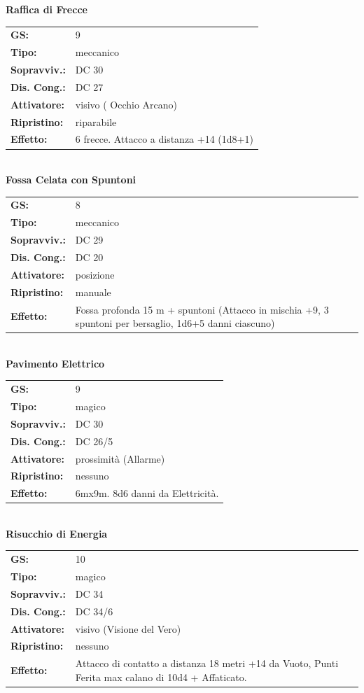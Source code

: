 \begin{multicols}{2}
\textbf{Raffica di Frecce}

\begin{tabularx}{0.48\textwidth}{lX}
	\textbf{GS:} & 9 \\
	\textbf{Tipo:} & meccanico \\
	\textbf{Sopravviv.:} & DC 30 \\
	\textbf{Dis. Cong.:} & DC 27 \\
	\textbf{Attivatore:} & visivo ( Occhio Arcano) \\
	\textbf{Ripristino:} & riparabile \\
	\textbf{Effetto:} & 6 frecce. Attacco a distanza +14 (1d8+1)
\end{tabularx}\\

\textbf{Fossa Celata con Spuntoni}

\begin{tabularx}{0.48\textwidth}{lX}
	\textbf{GS:} & 8 \\
	\textbf{Tipo:} & meccanico \\
	\textbf{Sopravviv.:} & DC 29 \\
	\textbf{Dis. Cong.:} & DC 20 \\
	\textbf{Attivatore:} & posizione \\
	\textbf{Ripristino:} & manuale \\
	\textbf{Effetto:} & Fossa profonda 15 m + spuntoni (Attacco in mischia +9, 3 spuntoni per bersaglio, 1d6+5 danni ciascuno)
\end{tabularx}\\

\textbf{Pavimento Elettrico}

\begin{tabularx}{0.48\textwidth}{lX}
	\textbf{GS:} & 9 \\
	\textbf{Tipo:} & magico \\
	\textbf{Sopravviv.:} & DC 30 \\
	\textbf{Dis. Cong.:} & DC 26/5 \\
	\textbf{Attivatore:} & prossimità (Allarme) \\
	\textbf{Ripristino:} & nessuno \\
	\textbf{Effetto:} & 6mx9m. 8d6 danni da Elettricità.
\end{tabularx}\\

\textbf{Risucchio di Energia}

\begin{tabularx}{0.48\textwidth}{lX}
	\textbf{GS:} & 10 \\
	\textbf{Tipo:} & magico \\
	\textbf{Sopravviv.:} & DC 34 \\
	\textbf{Dis. Cong.:} & DC 34/6 \\
	\textbf{Attivatore:} & visivo (Visione del Vero) \\
	\textbf{Ripristino:} & nessuno \\
	\textbf{Effetto:} & Attacco di contatto a distanza 18 metri +14 da Vuoto, Punti Ferita max calano di 10d4 + Affaticato.
\end{tabularx}\\


\end{multicols}
